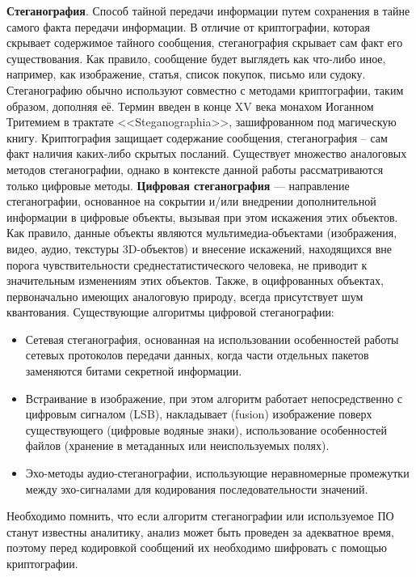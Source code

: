 \textbf{Стеганография}. Способ тайной передачи информации путем сохранения в тайне самого факта передачи информации. В отличие от криптографии, которая скрывает содержимое тайного сообщения, стеганография скрывает сам факт его существования. Как правило, сообщение будет выглядеть как что-либо иное, например, как изображение, статья, список покупок, письмо или судоку. Стеганографию обычно используют совместно с методами криптографии, таким образом, дополняя её. Термин введен  в конце XV века монахом Иоганном Тритемием в трактате <<Steganographia>>, зашифрованном под магическую книгу. Криптография защищает содержание сообщения,  стеганография --  сам факт наличия каких-либо скрытых посланий.  Существует множество аналоговых методов стеганографии, однако в контексте данной работы рассматриваются только цифровые методы.  \textbf{Цифровая стеганография} — направление  стеганографии, основанное на сокрытии и/или внедрении дополнительной информации в цифровые объекты, вызывая при этом   искажения этих объектов. Как правило, данные объекты являются мультимедиа-объектами (изображения, видео, аудио, текстуры 3D-объектов) и внесение искажений, находящихся вне порога чувствительности среднестатистического человека, не приводит к значительным изменениям этих объектов. Также, в оцифрованных объектах, первоначально имеющих аналоговую природу, всегда присутствует шум квантования. Существующие алгоритмы цифровой стеганографии:
\begin{itemize}
	\item Сетевая стеганография, основанная на использовании особенностей работы сетевых протоколов передачи данных, когда части отдельных пакетов заменяются битами секретной информации. %
	\item Встраивание в изображение, при этом алгоритм работает непосредственно с цифровым сигналом (LSB), накладывает (fusion) изображение поверх существующего (цифровые водяные знаки), использование особенностей файлов (хранение в метаданных или неиспользуемых полях).
	\item Эхо-методы аудио-стеганографии, использующие неравномерные промежутки между эхо-сигналами для кодирования последовательности значений. 
\end{itemize}
Необходимо помнить, что если алгоритм  стеганографии или используемое ПО станут известны аналитику, анализ может быть проведен за адекватное время, поэтому перед кодировкой сообщений их необходимо шифровать с помощью криптографии. \cite{Steg} %


